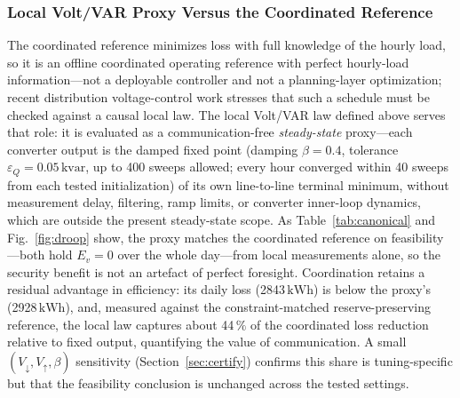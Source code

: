 \documentclass{ieeeaccess}
\newcommand{\SI}[2]{#1\,\ensuremath{\mathrm{#2}}}
\newcommand{\kvar}{\text{kvar}}
\begin{document}
\subsubsection{Local Volt/VAR Proxy Versus the Coordinated Reference}
\label{sec:droop}
The coordinated reference minimizes loss with full knowledge of the hourly load,
so it is an offline coordinated operating reference with perfect hourly-load
information---not a deployable controller and not a planning-layer optimization; recent
distribution voltage-control work \cite{rahman2024mpc,zhan2024ofo,hua2025safedrl}
stresses that such a schedule must be checked against a causal local law. The
local Volt/VAR law defined above serves that role: it is evaluated as a
communication-free \emph{steady-state} proxy---each converter output is the damped
fixed point (damping $\beta=0.4$, tolerance $\varepsilon_Q=\SI{0.05}{\kvar}$, up to
400 sweeps allowed; every hour converged within 40 sweeps from each tested
initialization) of its own line-to-line terminal minimum, without
measurement delay, filtering, ramp limits, or converter inner-loop dynamics, which
are outside the present steady-state scope. As Table~\ref{tab:canonical} and
Fig.~\ref{fig:droop} show, the proxy matches the coordinated reference on
feasibility---both hold $E_v=0$ over the whole day---from local measurements alone,
so the security benefit is not an artefact of perfect foresight. Coordination
retains a residual advantage in efficiency: its daily loss (\SI{2843}{kWh}) is
below the proxy's (\SI{2928}{kWh}), and, measured against the constraint-matched
reserve-preserving reference, the local law captures about \SI{44}{\%} of
the coordinated loss reduction relative to fixed output, quantifying the value of
communication. A small $(V_\downarrow,V_\uparrow,\beta)$ sensitivity
(Section~\ref{sec:certify}) confirms this share is tuning-specific but that the
feasibility conclusion is unchanged across the tested settings.
\end{document}

